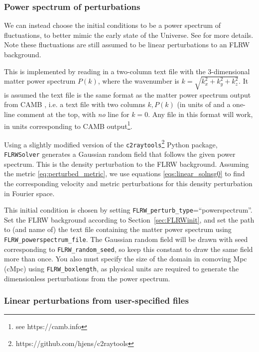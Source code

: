 \subsubsection{Power spectrum of perturbations}\label{sec:pspec_ics}

We can instead choose the initial conditions to be a power spectrum of fluctuations, to better mimic the early state of the Universe. See \cite{macpherson2019} for more details. 
Note these fluctuations are still assumed to be linear perturbations to an FLRW background. 

This is implemented by reading in a two-column text file with the 3-dimensional matter power spectrum $P(k)$, where the wavenumber is $k=\sqrt{k_x^2+k_y^2+k_z^2}$. It is assumed the text file is the same format as the matter power spectrum output from CAMB \cite{lewis2002}, i.e. a text file with two columns $k, P(k)$ (in units of  and a one-line comment at the top, with \emph{no} line for $k=0$. Any file in this format will work, in units corresponding to CAMB output\footnote{see https://camb.info}.

Using a slightly modified version of the \texttt{c2raytools}\footnote{https://github.com/hjens/c2raytools} Python package, \texttt{FLRWSolver} generates a Gaussian random field that follows the given power spectrum. This is the density perturbation to the FLRW background. Assuming the metric \eqref{eq:perturbed_metric}, we use equations \eqref{eqs:linear_solnsg0} to find the corresponding velocity and metric perturbations for this density perturbation in Fourier space.

This initial condition is chosen by setting \texttt{FLRW\_perturb\_type}=``powerspectrum''. Set the FLRW background according to Section~\ref{sec:FLRWinit}, and set the path to (and name of) the text file containing the matter power spectrum using \texttt{FLRW\_powerspectrum\_file}. The Gaussian random field will be drawn with seed corresponding to \texttt{FLRW\_random\_seed}, so keep this constant to draw the same field more than once. You also must specify the size of the domain in comoving Mpc (cMpc) using \texttt{FLRW\_boxlength}, as physical units are required to generate the dimensionless perturbations from the power spectrum. 


\subsubsection{Linear perturbations from user-specified files}

